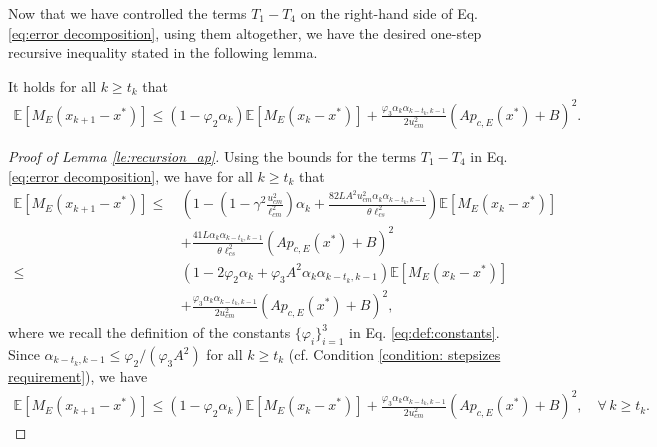 \documentclass[11 pt]{article}
\begin{document}
	Now that we have controlled the terms $T_1-T_4$ on the right-hand side of Eq. \eqref{eq:error decomposition}, using them altogether, we have the desired one-step recursive inequality stated in the following lemma.
	\begin{lemma}\label{le:recursion_ap}
		It holds  for all $k\geq t_k$ that
		\begin{align*}
			\mathbb{E}\left[M_E(x_{k+1}-x^*)\right]\leq
			\left(1-\varphi_2 \alpha_k\right)\mathbb{E}[M_E(x_k-x^*)] +\frac{\varphi_3\alpha_k\alpha_{k-t_k,k-1}}{2u_{cm}^2}\left(Ap_{c,E}(x^*)+B\right)^2.
		\end{align*}
	\end{lemma}
	\begin{proof}[Proof of Lemma \ref{le:recursion_ap}]
		Using the bounds for the terms $T_1-T_4$ in Eq. \eqref{eq:error decomposition}, we have for all $k\geq t_k$ that
		\begin{align*}
			\mathbb{E}[M_E(x_{k+1}-x^*)]\leq\,&
			\left(1-\left(1-\gamma^2 \frac{u^2_{cm}}{\ell^2_{cm}}\right)\alpha_k+\frac{82LA^2u_{cm}^2\alpha_k\alpha_{k-t_k,k-1}}{\theta\ell_{cs}^2}\right)\mathbb{E}[M_E(x_k-x^*)]\\
			&+\frac{41L\alpha_k\alpha_{k-t_k,k-1}}{\theta\ell_{cs}^2}\left(Ap_{c,E}(x^*)+B\right)^2\\
			\leq \,&\left(1-2\varphi_2 \alpha_k+ \varphi_3 A^2\alpha_k\alpha_{k-t_k,k-1}\right)\mathbb{E}[M_E(x_k-x^*)]\\ &+\frac{\varphi_3\alpha_k\alpha_{k-t_k,k-1}}{2u_{cm}^2}\left(Ap_{c,E}(x^*)+B\right)^2,
		\end{align*}
		where we recall the definition of the constants $\{\varphi_i\}^3_{i=1}$ in Eq. \eqref{eq:def:constants}. Since $\alpha_{k-t_k,k-1} \leq \varphi_2/(\varphi_3A^2)$ for all $k \geq t_k$ (cf. Condition \ref{condition: stepsizes requirement}), we have
		\begin{align*}
			\mathbb{E}\left[M_E(x_{k+1}-x^*)\right]\leq
			\left(1-\varphi_2 \alpha_k\right)\mathbb{E}[M_E(x_k-x^*)] +\frac{\varphi_3\alpha_k\alpha_{k-t_k,k-1}}{2u_{cm}^2}\left(Ap_{c,E}(x^*)+B\right)^2,\quad \forall\,k\geq t_k.
		\end{align*}
	\end{proof}
	
\end{document}
